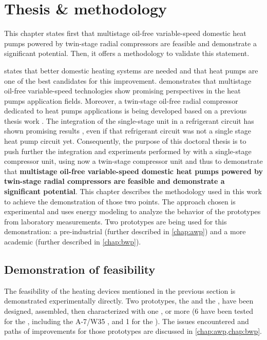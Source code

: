 \chapter{Thesis \& methodology}
\label{chap:methodo}
\resetallacronyms

\begin{shaded}
  This chapter states first that multistage oil-free variable-speed
  domestic heat pumps powered by twin-stage radial compressors are
  feasible and demonstrate a significant potential. Then, it offers a
  methodology to validate this statement.
\end{shaded}


 states that better domestic heating systems are
needed and that heat pumps are one of the best candidates for this
improvement.  demonstrates that multistage oil-free
variable-speed technologies show promising perspectives in the heat
pumps application fields. Moreover, a twin-stage oil-free radial
compressor dedicated to heat pumps applications is being developed
based on a previous thesis work \citep{schiffmann-2008a}. The
integration of the single-stage unit in a refrigerant circuit has
shown promising results \citep[p.\,221]{schiffmann-2008a}, even if
that refrigerant circuit was not a single stage heat pump circuit
yet. Consequently, the purpose of this doctoral thesis is to push
further the integration and experiments performed by
\citet{schiffmann-2008a} with a single-stage compressor unit, using
now a twin-stage compressor unit and thus to demonstrate that
\textbf{multistage oil-free variable-speed domestic heat pumps powered
  by twin-stage radial compressors are feasible and demonstrate a
  significant potential}. This chapter describes the methodology used
in this work to achieve the demonstration of those two points. The
approach chosen is experimental and uses energy modeling to analyze
the behavior of the prototypes from laboratory measurements. Two
prototypes are being used for this demonstration: a pre-industrial
\AWP{} (further described in \cref{chap:awp}) and a more academic
\BWP{} (further described in \cref{chap:bwp}).

\section{Demonstration of feasibility}
\label{sec:feasability-demo}

The feasibility of the heating devices mentioned in the previous
section is demonstrated experimentally directly. Two prototypes, the
\AWP{} and the \BWP{}, have been designed, assembled, then
characterized with one \OP{}, or more (6 \OP{} have been tested for
the \AWP{}, including the A-7/W35 \OP{}, and 1 \OP{} for the
\BWP{}). The issues encountered and paths of improvements for those
prototypes are discussed in \cref{chap:awp,chap:bwp}.

